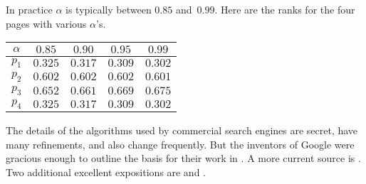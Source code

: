 In practice $\alpha$ is typically between $0.85$ and~$0.99$.
Here are the ranks for the four pages with various
$\alpha$'s.
\begin{center}
  \begin{tabular}{r|cccc}
    \multicolumn{1}{c}{$\alpha$}
          &$0.85$  &$0.90$  &$0.95$ &$0.99$ \\ \hline
    $p_1$ &$0.325$ &$0.317$ &$0.309$  &$0.302$  \\
    $p_2$ &$0.602$ &$0.602$ &$0.602$  &$0.601$  \\
    $p_3$ &$0.652$ &$0.661$ &$0.669$  &$0.675$  \\
    $p_4$ &$0.325$ &$0.317$ &$0.309$  &$0.302$  
  \end{tabular}
\end{center}


\medskip
The details of the algorithms used by commercial search engines are 
secret, have many refinements, and also change frequently.
But the inventors of Google were gracious enough to outline the basis for 
their work in \cite{BrinPage}.
A more current source is \cite{WikipediaPageRank}.
Two additional excellent expositions are 
\cite{Wills} and
\cite{Austin}.

